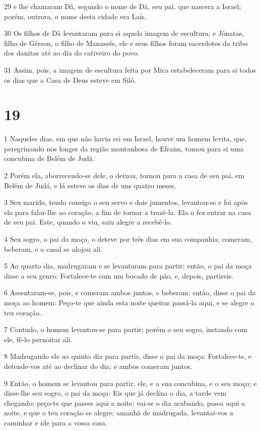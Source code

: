 \par 29 e lhe chamaram Dã, segundo o nome de Dã, seu pai, que nascera a Israel; porém, outrora, o nome desta cidade era Laís.
\par 30 Os filhos de Dã levantaram para si aquela imagem de escultura; e Jônatas, filho de Gérson, o filho de Manassés, ele e seus filhos foram sacerdotes da tribo dos danitas até ao dia do cativeiro do povo.
\par 31 Assim, pois, a imagem de escultura feita por Mica estabeleceram para si todos os dias que a Casa de Deus esteve em Siló.

\chapter{19}

\par 1 Naqueles dias, em que não havia rei em Israel, houve um homem levita, que, peregrinando nos longes da região montanhosa de Efraim, tomou para si uma concubina de Belém de Judá.
\par 2 Porém ela, aborrecendo-se dele, o deixou, tornou para a casa de seu pai, em Belém de Judá, e lá esteve os dias de uns quatro meses.
\par 3 Seu marido, tendo consigo o seu servo e dois jumentos, levantou-se e foi após ela para falar-lhe ao coração, a fim de tornar a trazê-la. Ela o fez entrar na casa de seu pai. Este, quando o viu, saiu alegre a recebê-lo.
\par 4 Seu sogro, o pai da moça, o deteve por três dias em sua companhia; comeram, beberam, e o casal se alojou ali.
\par 5 Ao quarto dia, madrugaram e se levantaram para partir; então, o pai da moça disse a seu genro: Fortalece-te com um bocado de pão, e, depois, partireis.
\par 6 Assentaram-se, pois, e comeram ambos juntos, e beberam; então, disse o pai da moça ao homem: Peço-te que ainda esta noite queiras passá-la aqui, e se alegre o teu coração.
\par 7 Contudo, o homem levantou-se para partir; porém o seu sogro, instando com ele, fê-lo pernoitar ali.
\par 8 Madrugando ele ao quinto dia para partir, disse o pai da moça: Fortalece-te, e detende-vos até ao declinar do dia; e ambos comeram juntos.
\par 9 Então, o homem se levantou para partir, ele, e a sua concubina, e o seu moço; e disse-lhe seu sogro, o pai da moça: Eis que já declina o dia, a tarde vem chegando; peço-te que passes aqui a noite; vai-se o dia acabando, passa aqui a noite, e que o teu coração se alegre; amanhã de madrugada, levantai-vos a caminhar e ide para a vossa casa.

